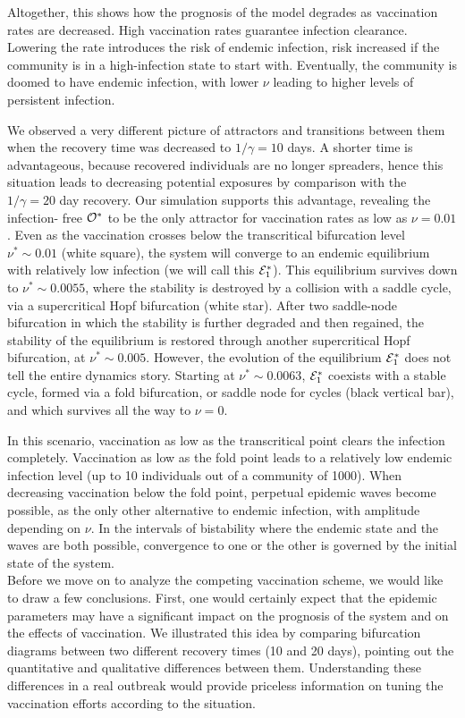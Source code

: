 \documentclass[10pt]{article}
\begin{document}
Altogether, this shows how the prognosis of the model degrades as vaccination rates are decreased. High vaccination rates guarantee infection clearance. Lowering the rate introduces the risk of endemic infection, risk increased if the community is in a high-infection state to start with. Eventually, the community is doomed to have endemic infection, with lower $\nu$ leading to higher levels of persistent infection. 


We observed a very different picture of attractors and transitions between them when the recovery time was decreased to $1/\gamma = 10$ days. A shorter time is advantageous, because recovered individuals are no longer spreaders, hence this situation leads to decreasing potential exposures by comparison with the $1/\gamma=20$ day recovery. Our simulation supports this advantage, revealing the infection- free ${\cal O}^*$ to be the only attractor for vaccination rates as low as $\nu = 0.01$. Even as the vaccination crosses below the transcritical bifurcation level $\nu^* \sim 0.01$ (white square), the system will converge to an endemic equilibrium with relatively low infection (we will call this ${\cal E}^*_1$). This equilibrium survives down to $\nu^* \sim 0.0055$, where the stability is destroyed by a collision with a saddle cycle, via a supercritical Hopf bifurcation (white star). After two saddle-node bifurcation in which the stability is further degraded and then regained, the stability of the equilibrium is restored through another supercritical Hopf bifurcation, at $\nu^* \sim 0.005$. However, the evolution of the equilibrium ${\cal E}^*_1$ does not tell the entire dynamics story. Starting at $\nu^* \sim 0.0063$, ${\cal E}^*_1$ coexists with a stable cycle, formed via a fold bifurcation, or saddle node for cycles (black vertical bar), and which survives all the way to $\nu=0$. 

In this scenario, vaccination as low as the transcritical point clears the infection completely. Vaccination as low as the fold point leads to a relatively low endemic infection level (up to 10 individuals out of a community of 1000). When decreasing vaccination below the fold point, perpetual epidemic waves become possible, as the only other alternative to endemic infection, with amplitude depending on $\nu$. In the intervals of bistability where the endemic state and the waves are both possible, convergence to one or the other is governed by the initial state of the system.\\

\noindent Before we move on to analyze the competing vaccination scheme, we would like to draw a few conclusions. First, one would certainly expect that the epidemic parameters may have a significant impact on the prognosis of the system and on the effects of vaccination. We illustrated this idea by comparing bifurcation diagrams between two different recovery times (10 and 20 days), pointing out the quantitative and qualitative differences between them. Understanding these differences in a real outbreak would provide priceless information on tuning the vaccination efforts according to the situation.
\end{document}
